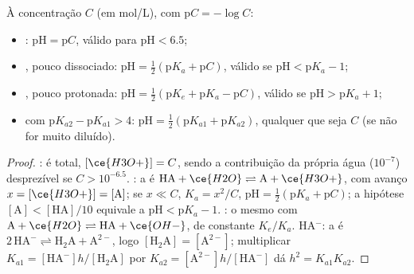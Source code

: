 \begin{proposition}\label{prop:b1:predominant-reaction:ph-formulas}
À concentração $C$ (em \unit{mol/L}), com $\mathrm{p}C = -\log C$:
\begin{itemize}
  \item {}: $\mathrm{pH} = \mathrm{p}C$, válido para
        $\mathrm{pH} < 6.5$;
  \item {}, pouco dissociado: $\mathrm{pH} = \frac12(\mathrm{p}K_a
        + \mathrm{p}C)$, válido se $\mathrm{pH} < \mathrm{p}K_a - 1$;
  \item {}, pouco protonada: $\mathrm{pH} = \frac12(\mathrm{p}K_e +
        \mathrm{p}K_a - \mathrm{p}C)$, válido se $\mathrm{pH} > \mathrm{p}K_a +
        1$;
  \item {} com $\mathrm{p}K_{a2} - \mathrm{p}K_{a1} > 4$:
        $\mathrm{pH} = \frac12(\mathrm{p}K_{a1} + \mathrm{p}K_{a2})$,
        qualquer que seja $C$ (se não for muito diluído).
\end{itemize}
\end{proposition}

\begin{proof}
:  é total, $[\ce{H3O+}] = C$,
sendo a contribuição da própria água ($10^{-7}$) desprezível se $C > 10^{-6.5}$.
: a  é $\mathrm{HA} + \ce{H2O}
\rightleftharpoons \mathrm{A} + \ce{H3O+}$, com avanço $x = [\ce{H3O+}]
= [\mathrm{A}]$; se $x \ll C$, $K_a = x^2/C$, $\mathrm{pH} = \frac12(\mathrm{p}K_a
+ \mathrm{p}C)$; a hipótese $[\mathrm{A}] < [\mathrm{HA}]/10$ equivale a
$\mathrm{pH} < \mathrm{p}K_a - 1$. : o mesmo com $\mathrm{A} +
\ce{H2O} \rightleftharpoons \mathrm{HA} + \ce{OH-}$, de constante $K_e/K_a$.
 HA$^-$: a  é $2\,\mathrm{HA}^- \rightleftharpoons
\mathrm{H_2A} + \mathrm{A}^{2-}$, logo $[\mathrm{H_2A}] = [\mathrm{A}^{2-}]$;
multiplicar $K_{a1} = [\mathrm{HA}^-]h/[\mathrm{H_2A}]$ por $K_{a2} =
[\mathrm{A}^{2-}]h/[\mathrm{HA}^-]$ dá $h^2 = K_{a1}K_{a2}$.
\end{proof}

